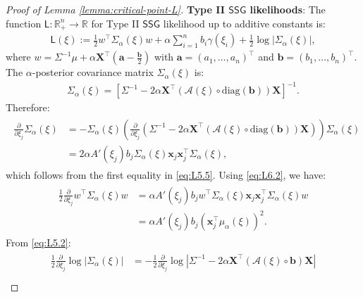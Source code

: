 \documentclass[12pt]{article}
\numberwithin{equation}{section}
\begin{document}
\begin{proof}[Proof of Lemma \ref{lemma:critical-point-L}]
\textbf{Type II $\mathsf{SSG}$ likelihoods}: The function $\mathsf{L}: \mathbb{R}_{+}^{n} \to \mathbb{R}$ for Type II $\mathsf{SSG}$ likelihood up to additive constants is:
\begin{align}\label{eq:f-Type-II}
\mathsf{L}(\xi) := \frac{1}{2}w^{\top}\Sigma_{\alpha}(\xi) w  +\alpha\sum_{i=1}^{n}b_i\gamma(\xi_i) + \frac{1}{2}\log |\Sigma_{\alpha}(\xi)|,
\end{align}
where $w = \Sigma^{-1}\mu + \alpha \mathbf{X}^{\top}\left(\mathbf{a} - \tfrac{\mathbf{b}}{2}\right)$ with $\mathbf{a} = (a_1, \ldots, a_n)^{\top}$ and $\mathbf{b} = (b_1, \ldots, b_n)^{\top}$. The $\alpha$-posterior covariance matrix $\Sigma_{\alpha}(\xi)$ is:
\begin{align}\label{eq:L6.1}
    \Sigma_{\alpha}(\xi) = [\Sigma^{-1} - 2\alpha \mathbf{X}^{\top}(\mathcal{A}(\xi)\circ \mathrm{diag}(\mathbf{b}))\mathbf{X}]^{-1}. 
\end{align}
Therefore:
\begin{align}\label{eq:L6.2}
    \begin{split}
        \frac{\partial}{\partial \xi_j}\Sigma_{\alpha}(\xi) &= -\Sigma_{\alpha}(\xi)\left(\frac{\partial}{\partial \xi_j}(\Sigma^{-1} - 2\alpha \mathbf{X}^{\top}(\mathcal{A}(\xi)\circ \mathrm{diag}(\mathbf{b}))\mathbf{X})\right)\Sigma_{\alpha}(\xi)\\
        &= 2\alpha A'(\xi_j)b_j\Sigma_{\alpha}(\xi)\mathbf{x}_j\mathbf{x}_j^{\top}\Sigma_{\alpha}(\xi),
    \end{split}
\end{align}
which follows from the first equality in \eqref{eq:L5.5}. Using \eqref{eq:L6.2}, we have:
\begin{align}\label{eq:L6.3}
\begin{split}
        \frac{1}{2}\frac{\partial}{\partial \xi_j}w^{\top}\Sigma_{\alpha}(\xi)w &= \alpha A'(\xi_j)b_jw^{\top}\Sigma_{\alpha}(\xi)\mathbf{x}_j\mathbf{x}_j^{\top}\Sigma_{\alpha}(\xi)w\\
        &= \alpha A'(\xi_j)b_j\left(\mathbf{x}_j^{\top}\mu_{\alpha}(\xi)\right)^2.
\end{split}
\end{align}
From \eqref{eq:L5.2}:
\begin{align}\label{eq:L6.4}
    \begin{split}
        \frac{1}{2}\frac{\partial}{\partial \xi_j}\log|\Sigma_{\alpha}(\xi)| &= -\frac{1}{2}\frac{\partial}{\partial \xi_j}\log|\Sigma^{-1} - 2\alpha \mathbf{X}^{\top}\left(\mathcal{A}(\xi)\circ \mathbf{b}\right)\mathbf{X}|\\

\end{split}
\end{align}
\end{proof}
\end{document}
